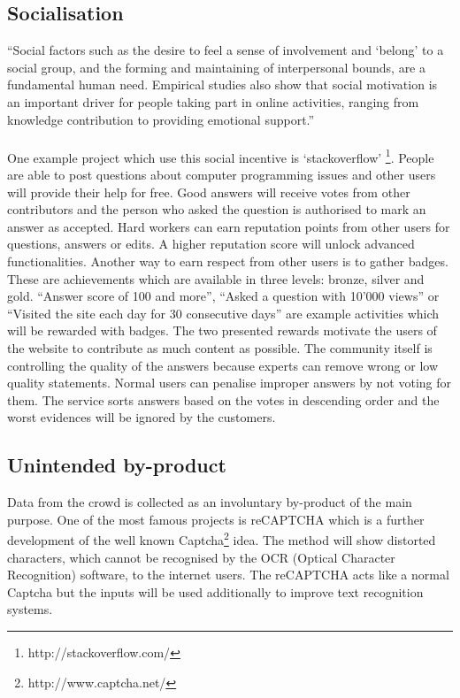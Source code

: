 \subsection{Socialisation}
``Social factors such as the desire to feel a sense of involvement and `belong' to a social group, and the forming and maintaining of interpersonal bounds, are a fundamental human need. Empirical studies also show that social motivation is an important driver for people taking part in online activities, ranging from knowledge contribution to providing emotional support.'' \cite{yu} \\
\\
One example project which use this social incentive is `stackoverflow' \footnote{http://stackoverflow.com/}. People are able to post questions about computer programming issues and other users will provide their help for free. Good answers will receive votes from other contributors and the person who asked the question is authorised to mark an answer as accepted. Hard workers can earn reputation points from other users for questions, answers or edits. A higher reputation score will unlock advanced functionalities. Another way to earn respect from other users is to gather badges. These are achievements which are available in three levels: bronze, silver and gold. ``Answer score of 100 and more'', ``Asked a question with 10'000 views'' or ``Visited the site each day for 30 consecutive days'' are example activities which will be rewarded with badges. The two presented rewards motivate the users of the website to contribute as much content as possible. The community itself is controlling the quality of the answers because experts can remove wrong or low quality statements. Normal users can penalise improper answers by not voting for them. The service sorts answers based on the votes in descending order and the worst evidences will be ignored by the customers.

\subsection{Unintended by-product}
Data from the crowd is collected as an involuntary by-product of the main purpose. One of the most famous projects is reCAPTCHA\cite{recaptcha} which is a further development of the well known Captcha\footnote{http://www.captcha.net/} idea. The method will show distorted characters,  which cannot be recognised by the OCR (Optical Character Recognition) software, to the internet users. The reCAPTCHA acts like a normal Captcha but the inputs will be used additionally to improve text recognition systems.

